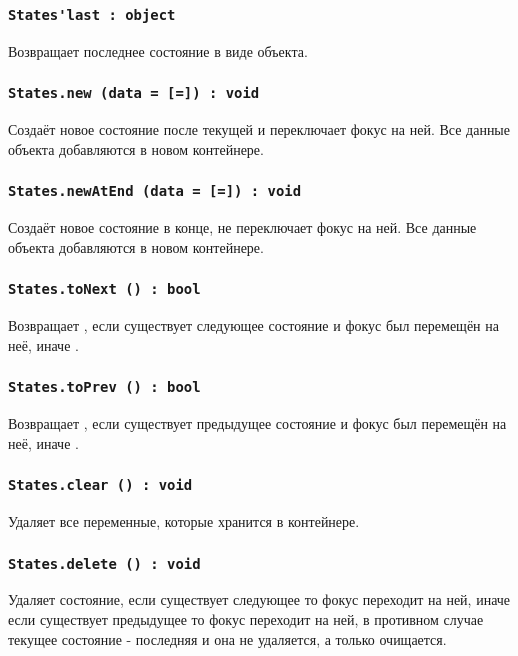 \subsubsection{\lstinline|States'last : object|}

Возвращает последнее состояние в виде объекта.

\subsubsection{\lstinline|States.new (data = [=]) : void|}

Создаёт новое состояние после текущей и переключает фокус на ней. Все данные объекта  добавляются в новом контейнере.

\subsubsection{\lstinline|States.newAtEnd (data = [=]) : void|}

Создаёт новое состояние в конце, не переключает фокус на ней. Все данные объекта  добавляются в новом контейнере.

\subsubsection{\lstinline|States.toNext () : bool|}

Возвращает \true, если существует следующее состояние и фокус был перемещён на неё, иначе \false.

\subsubsection{\lstinline|States.toPrev () : bool|}

Возвращает \true, если существует предыдущее состояние и фокус был перемещён на неё, иначе \false.

\subsubsection{\lstinline|States.clear () : void|}

Удаляет все переменные, которые хранится в контейнере.

\subsubsection{\lstinline|States.delete () : void|}

Удаляет состояние, если существует следующее то фокус переходит на ней, иначе если существует предыдущее то фокус переходит на ней, в противном случае текущее состояние - последняя и она не удаляется, а только очищается.


